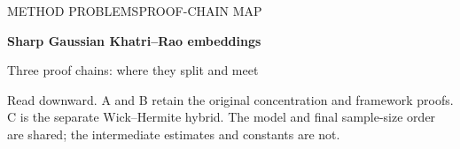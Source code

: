 \documentclass[11pt]{article}
\numberwithin{equation}{section}
\theoremstyle{definition}\newtheorem{definition}[theorem]{Definition}
\theoremstyle{remark}\newtheorem{remark}[theorem]{Remark}
\begin{document}
\thispagestyle{empty}
{\sffamily\color{Navy}\small METHOD PROBLEMS\hfill PROOF-CHAIN MAP\par}
\vspace{3mm}
{\sffamily\bfseries\fontsize{24}{28}\selectfont Sharp Gaussian Khatri--Rao embeddings\par}
\vspace{1.5mm}
{\sffamily\large Three proof chains: where they split and meet\par}
\vspace{2mm}
{\small Read downward. A and B retain the original concentration and framework proofs.
C is the separate Wick--Hermite hybrid. The model and final sample-size order
are shared; the intermediate estimates and constants are not.\par}
\vspace{1mm}
\newlength{\KRFullWidth}\setlength{\KRFullWidth}{\dimexpr\textwidth-16pt\relax}
\newlength{\KRColumnWidth}\setlength{\KRColumnWidth}{.333333\textwidth}
\addtolength{\KRColumnWidth}{-4mm}\addtolength{\KRColumnWidth}{-12pt}
\newlength{\KRColumnOffset}\setlength{\KRColumnOffset}{.333333\textwidth}
\addtolength{\KRColumnOffset}{2mm}
\end{document}
